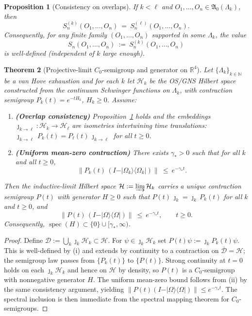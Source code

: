 \documentclass[11pt]{amsart}
\theoremstyle{plain}
\newtheorem{theorem}{Theorem}[section]
\newtheorem{proposition}[theorem]{Proposition}
\theoremstyle{definition}
\theoremstyle{remark}
\begin{document}
\begin{proposition}[Consistency on overlaps]\label{prop:consistency-overlaps}
If $k<\ell$ and $O_1,\dots,O_n\in\mathfrak A_0(\Lambda_k)$, then
\[
  S^{(k)}_n(O_1,\dots,O_n)\ =\ S^{(\ell)}_n(O_1,\dots,O_n).
\]
Consequently, for any finite family $(O_1,\dots,O_n)$ supported in some $\Lambda_k$, the value
\[
  S_n(O_1,\dots,O_n)\ :=\ S^{(k)}_n(O_1,\dots,O_n)
\]
is well-defined (independent of $k$ large enough).
\end{proposition}

\begin{theorem}[Projective-limit $C_0$-semigroup and generator on $\mathbb R^4$]\label{thm:proj-semigroup}
Let $\{\Lambda_k\}_{k\in\mathbb N}$ be a van Hove exhaustion and for each $k$ let $\mathcal H_k$ be the OS/GNS Hilbert space constructed from the continuum Schwinger functions on $\Lambda_k$, with contraction semigroup $P_k(t)=e^{-tH_k}$, $H_k\ge 0$. Assume:
\begin{enumerate}[label=(\roman*), leftmargin=2em]
  \item \textbf{(Overlap consistency)} Proposition~\ref{prop:consistency-overlaps} holds and the embeddings $\jmath_{k\to \ell}:\mathcal H_k\to\mathcal H_\ell$ are isometries intertwining time translations: $\jmath_{k\to \ell}\,P_k(t)=P_\ell(t)\,\jmath_{k\to \ell}$ for all $t\ge 0$.
  \item \textbf{(Uniform mean-zero contraction)} There exists $\gamma_*>0$ such that for all $k$ and all $t\ge 0$,
  \[
    \big\|P_k(t)\,(I-\vert\Omega_k\rangle\langle\Omega_k\vert)\big\|\ \le\ e^{-\gamma_* t}.
  \]
\end{enumerate}
Then the inductive-limit Hilbert space $\mathcal H:=\varinjlim \mathcal H_k$ carries a unique contraction semigroup $P(t)$ with generator $H\ge 0$ such that $P(t)\,\jmath_k=\jmath_k\,P_k(t)$ for all $k$ and $t\ge 0$, and
\[
  \big\|P(t)\,(I-\vert\Omega\rangle\langle\Omega\vert)\big\|\ \le\ e^{-\gamma_* t},\qquad t\ge 0.
\]
Consequently, $\operatorname{spec}(H)\subset\{0\}\cup[\gamma_*,\infty)$.
\end{theorem}
\begin{proof}
Define $\mathcal D:=\bigcup_k \jmath_k\mathcal H_k\subset \mathcal H$. For $\psi\in \jmath_k\mathcal H_k$ set $P(t)\psi:=\jmath_k P_k(t)\psi$. This is well-defined by (i) and extends by continuity to a contraction on $\overline{\mathcal D}=\mathcal H$; the semigroup law passes from $\{P_k(t)\}$ to $\{P(t)\}$. Strong continuity at $t=0$ holds on each $\jmath_k\mathcal H_k$ and hence on $\mathcal H$ by density, so $P(t)$ is a $C_0$-semigroup with nonnegative generator $H$. The uniform mean-zero bound follows from (ii) by the same consistency argument, yielding $\|P(t)(I-\vert\Omega\rangle\langle\Omega\vert)\|\le e^{-\gamma_* t}$. The spectral inclusion is then immediate from the spectral mapping theorem for $C_0$-semigroups.
\end{proof}
\end{document}
